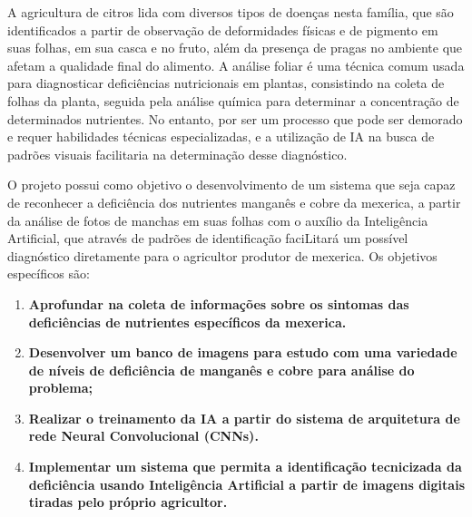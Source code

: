 A agricultura de citros lida com diversos tipos de doenças nesta família, que são identificados a partir de observação de deformidades físicas e de pigmento em suas folhas, em sua casca e no fruto, além da presença de pragas no ambiente que afetam a qualidade final do alimento. A análise foliar é uma técnica comum usada para diagnosticar deficiências nutricionais em plantas, consistindo na coleta de folhas da planta, seguida pela análise química para determinar a concentração de determinados nutrientes. No entanto, por ser um processo que pode ser demorado e requer habilidades técnicas especializadas, e a utilização de IA na busca de padrões visuais facilitaria na determinação desse diagnóstico.

O projeto possui como objetivo o desenvolvimento de um sistema que seja capaz de reconhecer a deficiência dos nutrientes manganês e cobre da mexerica, a partir da análise de fotos de manchas em suas folhas com o auxílio da Inteligência Artificial, que através de padrões de identificação faciLitará um possível diagnóstico diretamente para o agricultor produtor de mexerica. Os objetivos específicos são:
\begin{enumerate}
\item\textbf{Aprofundar na coleta de informações sobre os sintomas das deficiências de nutrientes específicos da mexerica.}
\item\textbf{Desenvolver um banco de imagens para estudo com uma variedade de níveis de deficiência de manganês e cobre para análise do problema;} 
\item\textbf{Realizar o treinamento da IA a partir do sistema de arquitetura de rede Neural Convolucional (CNNs).}
\item\textbf{Implementar um sistema que permita a identificação tecnicizada da deficiência usando Inteligência Artificial a partir de imagens digitais tiradas pelo próprio agricultor.}
\end{enumerate}